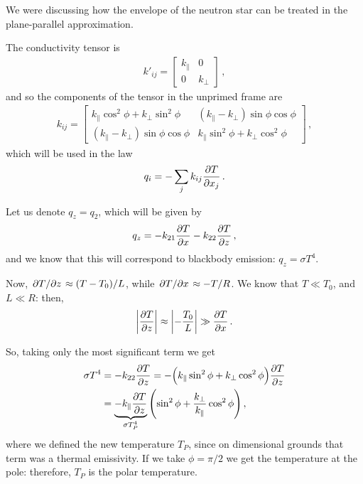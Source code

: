 \documentclass[main.tex]{subfiles}
\begin{document}

We were discussing how the envelope of the neutron star can be treated in the plane-parallel approximation. 

The conductivity tensor is 
%
\begin{align}
k'_{ij} = \left[\begin{array}{cc}
k_\parallel & 0 \\ 
0 & k_\perp
\end{array}\right]
\,,
\end{align}
%
and so the components of the tensor in the unprimed frame are 
%
\begin{align}
k_{ij} = \left[\begin{array}{cc}
k_\parallel \cos^2 \phi + k_\perp \sin^2\phi  & (k_\parallel - k_\perp) \sin \phi \cos \phi  \\ 
(k_\parallel - k_\perp) \sin \phi \cos \phi  & 
k_\parallel \sin^2 \phi + k_\perp \cos^2\phi
\end{array}\right]
\,,
\end{align}
%
which will be used in the law 
%
\begin{align}
q_i = - \sum _{j} k_{ij } \pdv{T}{x _j}
\,.
\end{align}

Let us denote \(q_z = q_2\), which will be given by 
%
\begin{align}
q_z = - k_{21} \pdv{T}{x} - k_{22} \pdv{T}{z}
\,,
\end{align}
%
and we know that this will correspond to blackbody emission: \(q_z = \sigma T^{4}\).

Now, \(\pdv*{T}{z} \approx (T - T_0 ) / L\), while \(\pdv*{T}{x} \approx - T/R\).
We know that \(T \ll T_0 \), and \(L \ll R\): then, 
%
\begin{align}
\abs{ \pdv{T}{z}} \approx \abs{- \frac{T_0}{L} } \gg \pdv{T}{x}
\,.
\end{align}

So, taking only the most significant term we get 
%
\begin{align}
\sigma T^{4} &= - k_{22} \pdv{T}{z} = - \qty(
k_\parallel \sin^2 \phi + k_\perp \cos^2\phi) \pdv{T}{z}   \\
&= \underbrace{- k_\parallel \pdv{T}{z}}_{\sigma T_P^{4}} \qty( \sin^2 \phi + \frac{k_\perp}{k_\parallel} \cos^2 \phi )
\,,
\end{align}
%
where we defined the new temperature \(T_P\), since on dimensional grounds that term was a thermal emissivity. If we take \(\phi = \pi /2\) we get the temperature at the pole: therefore, \(T_P\) is the polar temperature.
\end{document}
